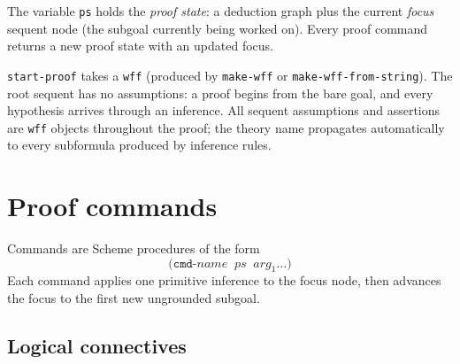 The variable \texttt{ps} holds the \emph{proof state}: a deduction graph
plus the current \emph{focus} sequent node (the subgoal currently being
worked on).  Every proof command returns a new proof state with an
updated focus.

\texttt{start-proof} takes a \texttt{wff} (produced by \texttt{make-wff} or \texttt{make-wff-from-string}).
The root sequent has no assumptions: a proof begins from the bare goal,
and every hypothesis arrives through an inference.  All sequent assumptions and assertions are
\texttt{wff} objects throughout the proof; the theory name propagates
automatically to every subformula produced by inference rules.

\section{Proof commands}
\label{sec:commands}

Commands are Scheme procedures of the form
\[
  \texttt{(cmd-}\mathit{name}\;\; \mathit{ps}\;\; \mathit{arg}_1 \ldots\texttt{)}
\]
Each command applies one primitive inference to the focus node, then
advances the focus to the first new ungrounded subgoal.

\subsection{Logical connectives}

